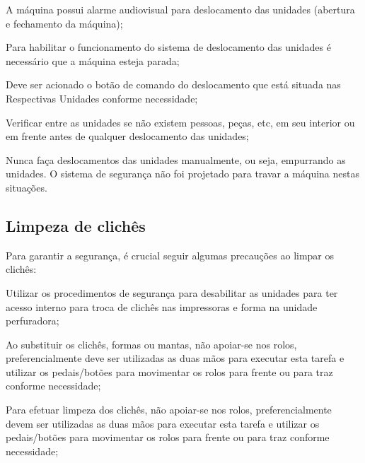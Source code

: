 \begin{generalSafetyToMoveUnities}
    \item[\ding{\dingNumber}] A máquina possui alarme audiovisual para deslocamento das unidades (abertura e fechamento da máquina);
    \item[\ding{\dingNumber}] Para habilitar o funcionamento do sistema de deslocamento das unidades é necessário que a máquina esteja
parada;
    \item[\ding{\dingNumber}] Deve ser acionado o botão de comando do deslocamento que está situada nas Respectivas Unidades conforme
necessidade;
    \item[\ding{\dingNumber}] Verificar entre as unidades se não existem pessoas, peças, etc, em seu interior ou em frente antes de qualquer
deslocamento das unidades;
    \item[\ding{\dingNumber}] Nunca faça deslocamentos das unidades manualmente, ou seja, empurrando as unidades. O sistema de
segurança não foi projetado para travar a máquina nestas situações.

\end{generalSafetyToMoveUnities}

\subsection{Limpeza de clichês}

Para garantir a segurança, é crucial seguir algumas precauções ao limpar os clichês:

\begin{generalRulesToPlateCleaning}
\item[\ding{\dingNumber}] Utilizar os procedimentos de segurança para desabilitar as unidades para ter acesso interno para troca de
clichês nas impressoras e forma na unidade perfuradora;
\item[\ding{\dingNumber}] Ao substituir os clichês, formas ou mantas, não apoiar-se nos rolos, preferencialmente deve ser utilizadas as
duas mãos para executar esta tarefa e utilizar os pedais/botões para movimentar os rolos para frente ou para traz
conforme necessidade;
\item[\ding{\dingNumber}] Para efetuar limpeza dos clichês, não apoiar-se nos rolos, preferencialmente devem ser utilizadas as duas mãos
para executar esta tarefa e utilizar os pedais/botões para movimentar os rolos para frente ou para traz conforme
necessidade;
\end{generalRulesToPlateCleaning}

